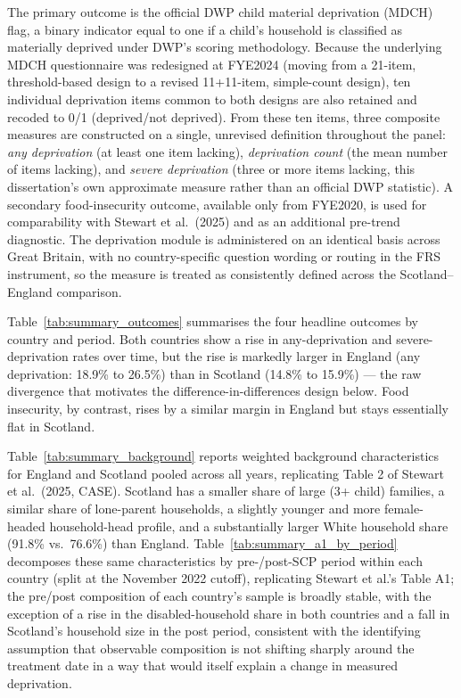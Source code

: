 The primary outcome is the official DWP child material deprivation (MDCH) flag, a binary indicator equal to one if a child's household is classified as materially deprived under DWP's scoring methodology. Because the underlying MDCH questionnaire was redesigned at FYE2024 (moving from a 21-item, threshold-based design to a revised 11+11-item, simple-count design), ten individual deprivation items common to both designs are also retained and recoded to 0/1 (deprived/not deprived). From these ten items, three composite measures are constructed on a single, unrevised definition throughout the panel: \emph{any deprivation} (at least one item lacking), \emph{deprivation count} (the mean number of items lacking), and \emph{severe deprivation} (three or more items lacking, this dissertation's own approximate measure rather than an official DWP statistic). A secondary food-insecurity outcome, available only from FYE2020, is used for comparability with Stewart et al.\ (2025) and as an additional pre-trend diagnostic. The deprivation module is administered on an identical basis across Great Britain, with no country-specific question wording or routing in the FRS instrument, so the measure is treated as consistently defined across the Scotland--England comparison.

Table~\ref{tab:summary_outcomes} summarises the four headline outcomes by country and period. Both countries show a rise in any-deprivation and severe-deprivation rates over time, but the rise is markedly larger in England (any deprivation: 18.9\% to 26.5\%) than in Scotland (14.8\% to 15.9\%) --- the raw divergence that motivates the difference-in-differences design below. Food insecurity, by contrast, rises by a similar margin in England but stays essentially flat in Scotland.



Table~\ref{tab:summary_background} reports weighted background characteristics for England and Scotland pooled across all years, replicating Table 2 of Stewart et al.\ (2025, CASE). Scotland has a smaller share of large (3+ child) families, a similar share of lone-parent households, a slightly younger and more female-headed household-head profile, and a substantially larger White household share (91.8\% vs.\ 76.6\%) than England. Table~\ref{tab:summary_a1_by_period} decomposes these same characteristics by pre-/post-SCP period within each country (split at the November 2022 cutoff), replicating Stewart et al.'s Table A1; the pre/post composition of each country's sample is broadly stable, with the exception of a rise in the disabled-household share in both countries and a fall in Scotland's household size in the post period, consistent with the identifying assumption that observable composition is not shifting sharply around the treatment date in a way that would itself explain a change in measured deprivation.

